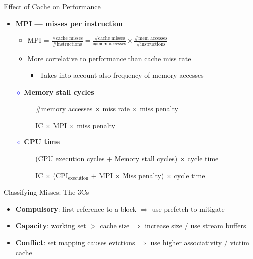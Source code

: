 \documentclass[aspectratio=169,12pt]{beamer}
\begin{document}
\begin{frame}{Effect of Cache on Performance}

\begin{itemize}
  \item \textbf{MPI — misses per instruction}
  \begin{itemize}
    \item MPI = $\frac{\text{\#cache misses}}{\text{\#instructions}} = \frac{\text{\#cache misses}}{\text{\#mem accesses}} \times \frac{\text{\#mem accesses}}{\text{\#instructions}}$
    \item More correlative to performance than cache miss rate
    \begin{itemize}
      \item Takes into account also frequency of memory accesses
    \end{itemize}
  \end{itemize}
  
  \vspace{0.4cm}
  
  \item[\textcolor{blue}{$\diamond$}] \textbf{Memory stall cycles}
  \begin{itemize}
    \item[] = \#memory accesses $\times$ miss rate $\times$ miss penalty
    \item[] = IC $\times$ MPI $\times$ miss penalty
  \end{itemize}
  
  \vspace{0.4cm}
  
  \item[\textcolor{blue}{$\diamond$}] \textbf{CPU time}
  \begin{itemize}
    \item[] = (CPU execution cycles + Memory stall cycles) $\times$ cycle time
    \item[] = IC $\times$ (CPI$_{\text{execution}}$ + MPI $\times$ Miss penalty) $\times$ cycle time
  \end{itemize}
\end{itemize}

\end{frame}

\begin{frame}{Classifying Misses: The 3Cs}
\begin{itemize}
  \item \textbf{Compulsory}: first reference to a block $\Rightarrow$ use prefetch to mitigate
  \item \textbf{Capacity}: working set $>$ cache size $\Rightarrow$ increase size / use stream buffers
  \item \textbf{Conflict}: set mapping causes evictions $\Rightarrow$ use higher associativity / victim cache
\end{itemize}
\end{frame}
\end{document}

